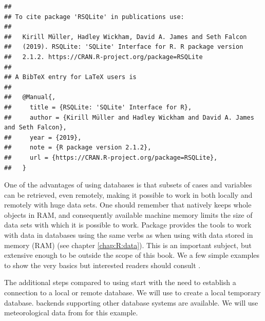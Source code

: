 \documentclass[krantz2]{krantz}\usepackage{knitr}%
\begin{document}
\begin{knitrout}\footnotesize
{}\color{fgcolor}\begin{kframe}
\begin{alltt}
\hlstd{(} \hlstd{=} \hlstd{)}
\end{alltt}
\begin{verbatim}
## 
## To cite package 'RSQLite' in publications use:
## 
##   Kirill Müller, Hadley Wickham, David A. James and Seth Falcon
##   (2019). RSQLite: 'SQLite' Interface for R. R package version
##   2.1.2. https://CRAN.R-project.org/package=RSQLite
## 
## A BibTeX entry for LaTeX users is
## 
##   @Manual{,
##     title = {RSQLite: 'SQLite' Interface for R},
##     author = {Kirill Müller and Hadley Wickham and David A. James and Seth Falcon},
##     year = {2019},
##     note = {R package version 2.1.2},
##     url = {https://CRAN.R-project.org/package=RSQLite},
##   }
\end{verbatim}
\end{kframe}
\end{knitrout}

One of the advantages of using databases is that subsets of cases and variables can be retrieved, even remotely, making it possible to work in \Rlang both locally and remotely with huge data sets. One should remember that \Rlang natively keeps whole objects in RAM, and consequently available machine memory limits the size of data sets with which it is possible to work. Package  provides the tools to work with data in databases using the same verbs as when using  with data stored in memory (RAM) (see chapter \ref{chap:R:data}). This is an important subject, but extensive enough to be outside the scope of this book. We a few simple examples to show the very basics but interested readers should consult  \autocite{Wickham2017}.

The additional steps compared to using  start with the need to establish a connection to a local or remote database. We will use  to create a local temporary  database.  backends supporting other database systems are available. We will use meteorological data from  for this example.
\end{document}
